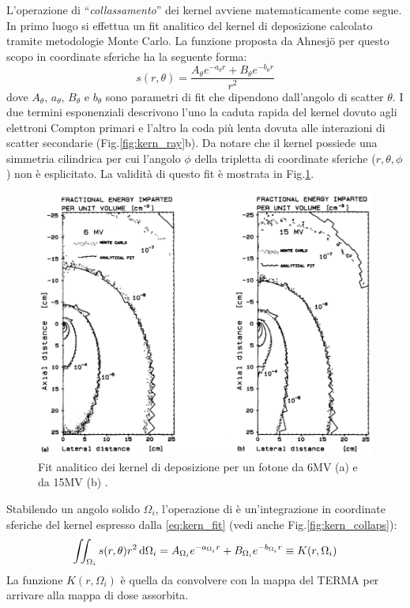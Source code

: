 {L'operazione di \textquotedblleft\textit{collassamento}\textquotedblright{} dei kernel avviene matematicamente come segue. In primo luogo si effettua un fit analitico del kernel di deposizione calcolato tramite metodologie Monte Carlo. La funzione proposta da Ahnesj\"{o} per questo scopo in coordinate sferiche ha la seguente forma:
\begin{equation}
\label{eq:kern_fit}
s(r,\theta) = \frac{A_\theta e^{-a_\theta r} + B_\theta e^{-b_\theta r}}{r^2}
\end{equation}
dove $A_\theta,\,a_\theta,\,B_\theta$ e $b_\theta$ sono parametri di fit che dipendono dall'angolo di scatter $\theta$. I due termini esponenziali descrivono l'uno la caduta rapida del kernel dovuto agli elettroni Compton primari e l'altro la coda più lenta dovuta alle interazioni di scatter secondarie (Fig.\ref{fig:kern_ray}b). Da notare che il kernel possiede una simmetria cilindrica per cui l'angolo $\phi$ della tripletta di coordinate sferiche ($r,\theta,\phi$) non è esplicitato. La validità di questo fit è mostrata in Fig.\ref{fig:kern_fit}.
\begin{figure}
\centering
\includegraphics[width=.8\textwidth]{./cap1/kern_fit.png}
\caption{Fit analitico dei kernel di deposizione per un fotone da 6MV (a) e da 15MV (b) \cite{Ahnesjo1989}.}
\label{fig:kern_fit}
\end{figure}

Stabilendo un angolo solido $\Omega_i$, l'operazione di  è un'integrazione in coordinate sferiche del kernel espresso dalla \eqref{eq:kern_fit} (vedi anche Fig.\ref{fig:kern_collaps}):
\begin{equation}
\iint_{\Omega_i} s(r,\theta) r^2\,\text{d} \Omega_i = A_{\Omega_i} e^{-a_{\Omega_i} r} + B_{\Omega_i} e^{-b_{\Omega_i} r} \equiv K(r,\Omega_i)
\end{equation}
La funzione $K(r,\Omega_i)$ è quella da convolvere con la mappa del TERMA per arrivare alla mappa di dose assorbita.

}
